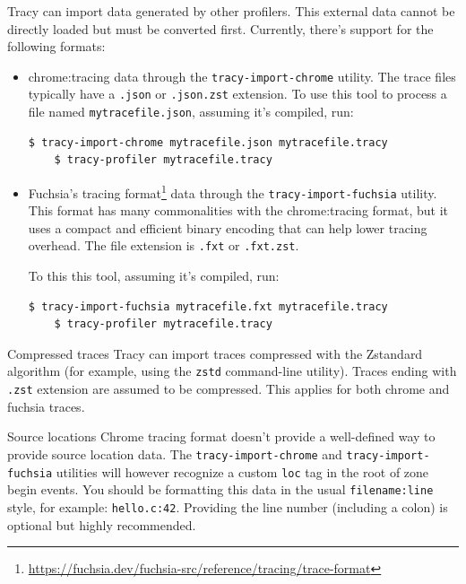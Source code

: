 \documentclass[hidelinks,titlepage,a4paper,twoside]{article}
\begin{document}
Tracy can import data generated by other profilers. This external data cannot be directly loaded but must be converted first.
Currently, there's support for the following formats:
\begin{itemize}
  \item chrome:tracing data through the \texttt{tracy-import-chrome} utility. The trace files
    typically have a \texttt{.json} or \texttt{.json.zst} extension.
    To use this tool to process a file named \texttt{mytracefile.json}, assuming it's compiled, run:
    \begin{lstlisting}[language=sh]
    $ tracy-import-chrome mytracefile.json mytracefile.tracy
    $ tracy-profiler mytracefile.tracy
    \end{lstlisting}
  \item Fuchsia's tracing format\footnote{\url{https://fuchsia.dev/fuchsia-src/reference/tracing/trace-format}}
    data through the \texttt{tracy-import-fuchsia} utility.
    This format has many commonalities with the chrome:tracing format, but it uses a
    compact and efficient binary encoding that can help lower tracing overhead.
    The file extension is \texttt{.fxt} or \texttt{.fxt.zst}.

    To this this tool, assuming it's compiled, run:
    \begin{lstlisting}[language=sh]
    $ tracy-import-fuchsia mytracefile.fxt mytracefile.tracy
    $ tracy-profiler mytracefile.tracy
    \end{lstlisting}
\end{itemize}

\begin{bclogo}[
noborder=true,
couleur=black!5,
logo=\bclampe
]{Compressed traces}
Tracy can import traces compressed with the Zstandard algorithm (for example, using the \texttt{zstd} command-line utility). Traces ending with \texttt{.zst} extension are assumed to be compressed.
This applies for both chrome and fuchsia traces.
\end{bclogo}

\begin{bclogo}[
noborder=true,
couleur=black!5,
logo=\bclampe
]{Source locations}
Chrome tracing format doesn't provide a well-defined way to provide source location data.
  The \texttt{tracy-import-chrome} and \texttt{tracy-import-fuchsia} utilities will however recognize a custom \texttt{loc} tag in the root of zone begin events. You should be formatting this data in the usual \texttt{filename:line} style, for example: \texttt{hello.c:42}. Providing the line number (including a colon) is optional but highly recommended.
\end{bclogo}
\end{document}
